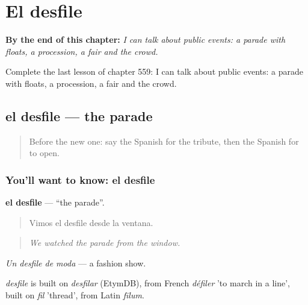 
\chapter{El desfile}
\label{ch:es-el-desfile}

\begin{chapteropening}
\textbf{By the end of this chapter:} \emph{I can talk about public events: a parade with floats, a procession, a fair and the crowd.}

Complete the last lesson of chapter 559: I can talk about public events: a parade with floats, a procession, a fair and the crowd.
\end{chapteropening}

\section[el desfile]{el desfile — the parade}

\label{lesson:ES-C559-desfile}



\begin{quote}
Before the new one: say the Spanish for the tribute, then the Spanish for to open.
\end{quote}

\subsection*{You'll want to know: el desfile}
\textbf{el desfile} — \textquotedblleft{}the parade\textquotedblright{}.

\begin{quote}
Vimos el desfile desde la ventana.
\end{quote}

\begin{quote}
\emph{We watched the parade from the window.}
\end{quote}

\emph{Un desfile de moda} — a fashion show.

\begin{cousinweb}
\emph{desfile} is built on \emph{desfilar} (EtymDB), from French \emph{défiler} 'to march in a line', built on \emph{fil} 'thread', from Latin \emph{fīlum}.
\end{cousinweb}


